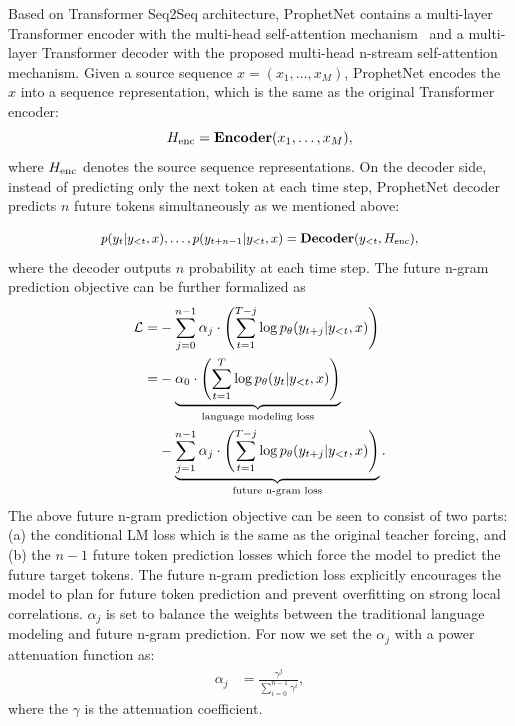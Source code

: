 \documentclass[11pt,a4paper]{article}
\begin{document}
Based on Transformer Seq2Seq architecture, ProphetNet contains a multi-layer Transformer encoder with the multi-head self-attention mechanism~\cite{vaswani2017attention} and a multi-layer Transformer decoder with the proposed multi-head n-stream self-attention mechanism.
Given a source sequence $x = (x_1, \dots, x_M)$, ProphetNet encodes the $x$ into a sequence representation, which is the same as the original Transformer encoder:
\begin{equation}
H_{\rm{enc}} = \textbf{Encoder}(x_1, \dots, x_M), 
\label{eq:encoder} 
\end{equation}
where $H_{\rm{enc}}$ denotes the source sequence representations.
On the decoder side, instead of predicting only the next token at each time step, ProphetNet decoder predicts $n$ future tokens simultaneously as we mentioned above:

\begin{align}
\small
\begin{split}
 & p(y_t|y_{<t},x), \dots, p(y_{t+n-1}|y_{<t},x)  = \textbf{Decoder}(y_{<t},H_{\rm{enc}}), \\
\end{split}
\label{decoder} 
\end{align}
where the decoder outputs $n$ probability at each time step.
The future n-gram prediction objective can be further formalized as 
\begin{align} 
    \mathcal{L} = &- \sum_{j=0}^{n-1} \alpha_j \cdot \left( \sum_{t=1}^{T-j} \log p_\theta(y_{t+j}|y_{<t},x)\right) \notag\\ 
    = &- \underbrace{\alpha_0 \cdot \left( \sum_{t=1}^T \log p_\theta(y_{t}|y_{<t},x)\right)}_{\text{language modeling loss}} \notag\\  
    &- \underbrace{\sum_{j=1}^{n-1} \alpha_{j} \cdot \left( \sum_{t=1}^{T-j} \log p_\theta(y_{t+j}|y_{<t},x)\right)}_{\text{future n-gram loss}}.
\end{align}
The above future n-gram prediction objective can be seen to consist of two parts: (a) the conditional LM loss which is the same as the original teacher forcing, and (b) the $n-1$ future token prediction losses which force the model to predict the future target tokens.
The future n-gram prediction loss explicitly encourages the model to plan for future token prediction and prevent overfitting on strong local correlations. 
$\alpha_j$ is set to balance the weights between the traditional language modeling and future n-gram prediction. 
For now we set the $\alpha_j$ with a power attenuation function as:
\begin{align}
    \alpha_{j} &= \frac{\gamma^j}{\sum_{i=0}^{n-1}\gamma^i},
\end{align}
where the $\gamma$ is the attenuation coefficient. 
\end{document}
